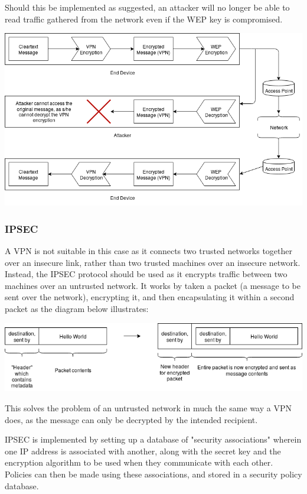 \documentclass[12pt]{article}
\begin{document}
Should this be implemented as suggested, an attacker will no longer be able to read traffic gathered from the network even if the WEP key is compromised.

\vspace{6px}
\centerline{\includegraphics[width=0.7\linewidth]{res/vpn_example_hack.png}}
\vspace{6px}

\subsubsection{IPSEC}
A VPN is not suitable in this case as it connects two trusted networks together over an insecure link, rather than two trusted machines over an insecure network. Instead, the IPSEC protocol should be used as it encrypts traffic between two machines over an untrusted network. It works by taken a packet (a message to be sent over the network), encrypting it, and then encapsulating it within a second packet as the diagram below illustrates:

\vspace{6px}
\includegraphics[scale=0.5]{res/ipsec}
\vspace{6px}

This solves the problem of an untrusted network in much the same way a VPN does, as the message can only be decrypted by the intended recipient.

IPSEC is implemented by setting up a database of "security associations" wherein one IP address is associated with another, along with the secret key and the encryption algorithm to be used when they communicate with each other. Policies can then be made using these associations, and stored in a security policy database.
\end{document}
